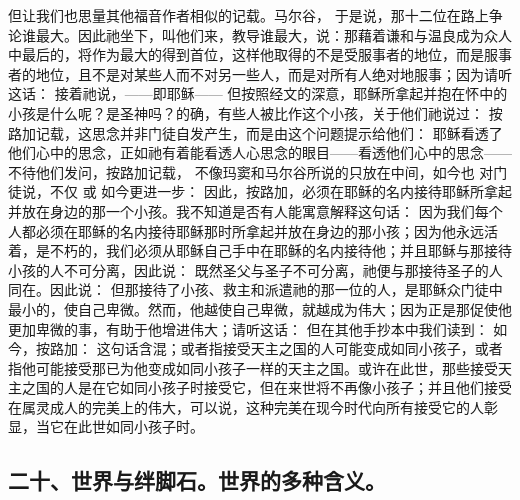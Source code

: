 但让我们也思量其他福音作者相似的记载。马尔谷， 于是说，那十二位在路上争论谁最大。因此祂坐下，叫他们来，教导谁最大，说：那藉着谦和与温良成为众人中最后的，将作为最大的得到首位，这样他取得的不是受服事者的地位，而是服事者的地位，且不是对某些人而不对另一些人，而是对所有人绝对地服事；因为请听这话：  接着祂说，——即耶稣——  但按照经文的深意，耶稣所拿起并抱在怀中的小孩是什么呢？是圣神吗？的确，有些人被比作这个小孩，关于他们祂说过： 按路加记载，这思念并非门徒自发产生，而是由这个问题提示给他们：  耶稣看透了他们心中的思念，正如祂有着能看透人心思念的眼目——看透他们心中的思念——不待他们发问，按路加记载， 不像玛窦和马尔谷所说的只放在中间，如今也 对门徒说，不仅 或 如今更进一步：  因此，按路加，必须在耶稣的名内接待耶稣所拿起并放在身边的那一个小孩。我不知道是否有人能寓意解释这句话： 因为我们每个人都必须在耶稣的名内接待耶稣那时所拿起并放在身边的那小孩；因为他永远活着，是不朽的，我们必须从耶稣自己手中在耶稣的名内接待他；并且耶稣与那接待小孩的人不可分离，因此说： 既然圣父与圣子不可分离，祂便与那接待圣子的人同在。因此说：  但那接待了小孩、救主和派遣祂的那一位的人，是耶稣众门徒中最小的，使自己卑微。然而，他越使自己卑微，就越成为伟大；因为正是那促使他更加卑微的事，有助于他增进伟大；请听这话： 但在其他手抄本中我们读到： 如今，按路加：  这句话含混；或者指接受天主之国的人可能变成如同小孩子，或者指他可能接受那已为他变成如同小孩子一样的天主之国。或许在此世，那些接受天主之国的人是在它如同小孩子时接受它，但在来世将不再像小孩子；并且他们接受在属灵成人的完美上的伟大，可以说，这种完美在现今时代向所有接受它的人彰显，当它在此世如同小孩子时。\par


\subsection{二十、世界与绊脚石。世界的多种含义。}

